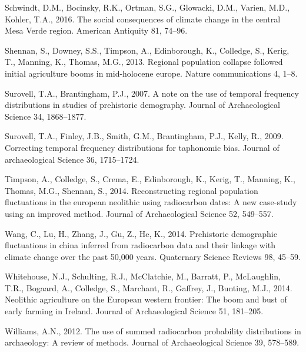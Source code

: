 \documentclass[
]{article}
\newlength{\cslhangindent}
\newenvironment{cslreferences}%
  {\setlength{\parindent}{0pt}%
  \everypar{\setlength{\hangindent}{\cslhangindent}}\ignorespaces}%
  {\par}
\begin{document}
\begin{cslreferences}
\leavevmode\hypertarget{ref-Schwindt2016}{}%
Schwindt, D.M., Bocinsky, R.K., Ortman, S.G., Glowacki, D.M., Varien, M.D., Kohler, T.A., 2016. The social consequences of climate change in the central Mesa Verde region. American Antiquity 81, 74--96.

\leavevmode\hypertarget{ref-Shennan2013}{}%
Shennan, S., Downey, S.S., Timpson, A., Edinborough, K., Colledge, S., Kerig, T., Manning, K., Thomas, M.G., 2013. Regional population collapse followed initial agriculture booms in mid-holocene europe. Nature communications 4, 1--8.

\leavevmode\hypertarget{ref-Surovell2007}{}%
Surovell, T.A., Brantingham, P.J., 2007. A note on the use of temporal frequency distributions in studies of prehistoric demography. Journal of Archaeological Science 34, 1868--1877.

\leavevmode\hypertarget{ref-Surovell2009}{}%
Surovell, T.A., Finley, J.B., Smith, G.M., Brantingham, P.J., Kelly, R., 2009. Correcting temporal frequency distributions for taphonomic bias. Journal of archaeological Science 36, 1715--1724.

\leavevmode\hypertarget{ref-Timpson2014}{}%
Timpson, A., Colledge, S., Crema, E., Edinborough, K., Kerig, T., Manning, K., Thomas, M.G., Shennan, S., 2014. Reconstructing regional population fluctuations in the european neolithic using radiocarbon dates: A new case-study using an improved method. Journal of Archaeological Science 52, 549--557.

\leavevmode\hypertarget{ref-Wang2014}{}%
Wang, C., Lu, H., Zhang, J., Gu, Z., He, K., 2014. Prehistoric demographic fluctuations in china inferred from radiocarbon data and their linkage with climate change over the past 50,000 years. Quaternary Science Reviews 98, 45--59.

\leavevmode\hypertarget{ref-Whitehouse2014}{}%
Whitehouse, N.J., Schulting, R.J., McClatchie, M., Barratt, P., McLaughlin, T.R., Bogaard, A., Colledge, S., Marchant, R., Gaffrey, J., Bunting, M.J., 2014. Neolithic agriculture on the European western frontier: The boom and bust of early farming in Ireland. Journal of Archaeological Science 51, 181--205.

\leavevmode\hypertarget{ref-Williams2012}{}%
Williams, A.N., 2012. The use of summed radiocarbon probability distributions in archaeology: A review of methods. Journal of Archaeological Science 39, 578--589.
\end{cslreferences}

\newpage
\end{document}
